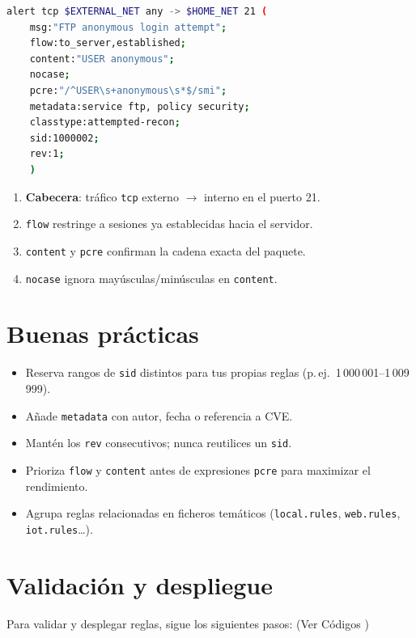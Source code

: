 \documentclass[11pt,a4paper,twoside]{report}
\begin{document}
\begin{lstlisting}[language=bash,caption={Regla que detecta intentos de login FTP anónimos.},label={lst:ejemplo-ftp}]
	alert tcp $EXTERNAL_NET any -> $HOME_NET 21 (
	msg:"FTP anonymous login attempt";
	flow:to_server,established;
	content:"USER anonymous";
	nocase;
	pcre:"/^USER\s+anonymous\s*$/smi";
	metadata:service ftp, policy security;
	classtype:attempted-recon;
	sid:1000002;
	rev:1;
	)
\end{lstlisting}

\begin{enumerate}
	\item \textbf{Cabecera}: tráfico \verb|tcp| externo $\rightarrow$ interno en el puerto 21.
	\item \verb|flow| restringe a sesiones ya establecidas hacia el servidor.
	\item \verb|content| y \verb|pcre| confirman la cadena exacta del paquete.
	\item \verb|nocase| ignora mayúsculas/minúsculas en \verb|content|.
\end{enumerate}

\section{Buenas prácticas}

\begin{itemize}
	\item Reserva rangos de \verb|sid| distintos para tus propias reglas (p.\,ej.\ 1\,000\,001–1\,009\,999).
	\item Añade \verb|metadata| con autor, fecha o referencia a CVE.
	\item Mantén los \verb|rev| consecutivos; nunca reutilices un \verb|sid|.
	\item Prioriza \verb|flow| y \verb|content| antes de expresiones \verb|pcre| para maximizar el rendimiento.
	\item Agrupa reglas relacionadas en ficheros temáticos (\verb|local.rules|, \verb|web.rules|, \verb|iot.rules|…).
\end{itemize}

\section{Validación y despliegue}

Para validar y desplegar reglas, sigue los siguientes pasos: (Ver Códigos )
\end{document}
